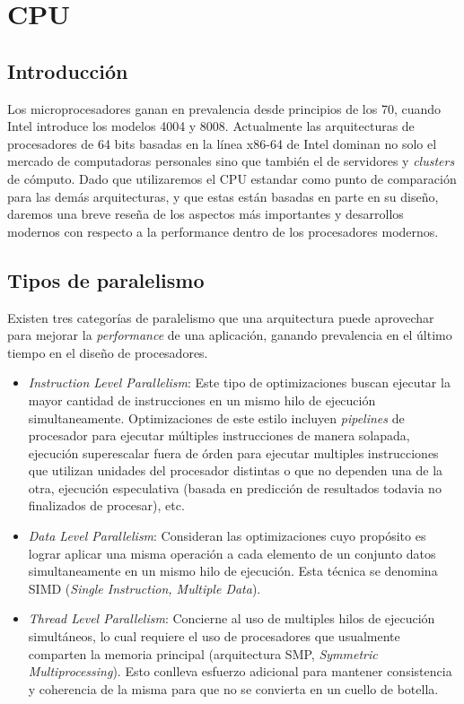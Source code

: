 \section {CPU}

\subsection{Introducci\'on}

Los microprocesadores ganan en prevalencia desde principios de los 70,
cuando Intel introduce los modelos 4004 y 8008. Actualmente las arquitecturas
de procesadores de 64 bits basadas en la l\'inea x86-64 de Intel
dominan no solo el mercado de computadoras personales sino que tambi\'en el de
servidores y \textit{clusters} de c\'omputo. Dado que utilizaremos el CPU
estandar como punto de comparaci\'on para las dem\'as arquitecturas, y que estas
est\'an basadas en parte en su dise\~no, daremos una breve rese\~na de los aspectos
m\'as importantes y desarrollos modernos con respecto a la performance dentro de
los procesadores modernos.

\subsection{Tipos de paralelismo}

Existen tres categor\'ias de paralelismo que una arquitectura puede aprovechar
para mejorar la \textit{performance} de una aplicaci\'on, ganando prevalencia
en el \'ultimo tiempo en el dise\~no de procesadores.

\begin{itemize}
    \item \textit{Instruction Level Parallelism}: Este tipo de optimizaciones buscan
    ejecutar la mayor cantidad de instrucciones en un mismo hilo de ejecuci\'on simultaneamente.
    Optimizaciones de este estilo incluyen
    \textit{pipelines} de procesador para ejecutar m\'ultiples instrucciones de manera solapada,
    ejecuci\'on superescalar fuera de \'orden para ejecutar multiples instrucciones que
    utilizan unidades del procesador distintas o que no dependen una de la otra, ejecuci\'on
    especulativa (basada en predicci\'on de resultados todavia no finalizados de procesar), etc.

    \item \textit{Data Level Parallelism}: Consideran las optimizaciones cuyo prop\'osito es
    lograr aplicar una misma operaci\'on a cada elemento de un conjunto datos simultaneamente
    en un mismo hilo de ejecuci\'on. Esta t\'ecnica se denomina SIMD
    (\textit{Single Instruction, Multiple Data}).

    \item \textit{Thread Level Parallelism}: Concierne al uso de multiples hilos de ejecuci\'on
    simult\'aneos, lo cual requiere el uso de procesadores que usualmente
    comparten la memoria principal (arquitectura SMP, \textit{Symmetric Multiprocessing}).
    Esto conlleva esfuerzo adicional para mantener consistencia y coherencia de la misma
    para que no se convierta en un cuello de botella.
\end{itemize}

